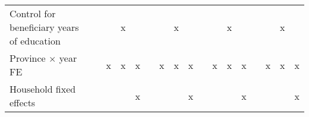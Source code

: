 {\begin{tabular}{l*{16}{c}}
Control for beneficiary years of education&                     &                     &           x         &                     &                     &                     &           x         &                     &                     &                     &           x         &                     &                     &                     &           x         &                     \\
Province $\times$  year FE&                     &           x         &           x         &           x         &                     &           x         &           x         &           x         &                     &           x         &           x         &           x         &                     &           x         &           x         &           x         \\
Household fixed effects&                     &                     &                     &           x         &                     &                     &                     &           x         &                     &                     &                     &           x         &                     &                     &                     &           x         \\
\bottomrule
\end{tabular}
}

